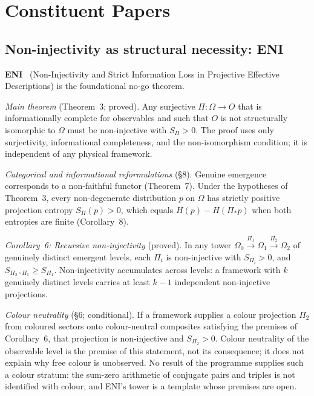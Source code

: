 \documentclass[11pt,a4paper]{article}
\theoremstyle{definition}
\newcommand{\SPI}{S_\Pi}
\begin{document}
  \section{Constituent Papers}
    \label{sec:papers}

    \subsection{Non-injectivity as structural necessity: ENI}
      \label{sec:eni}

      \textbf{ENI}~\cite{Beau2026l} (Non-Injectivity and Strict Information Loss in Projective
      Effective Descriptions) is the foundational no-go theorem.

      \textit{Main theorem} (Theorem~3; proved).
      Any surjective $\Pi : \Omega \to O$ that is informationally complete for observables
      and such that $O$ is not structurally isomorphic to $\Omega$ must be non-injective with
      $\SPI > 0$.
      The proof uses only surjectivity, informational completeness, and the non-isomorphism
      condition; it is independent of any physical framework.

      \textit{Categorical and informational reformulations} (§8).
      Genuine emergence corresponds to a non-faithful functor (Theorem~7).
      Under the hypotheses of Theorem~3, every non-degenerate distribution $p$ on $\Omega$ has
      strictly positive projection entropy $S_\Pi(p) > 0$, which equals $H(p) - H(\Pi_* p)$ when
      both entropies are finite (Corollary~8).

      \textit{Corollary~6: Recursive non-injectivity} (proved).
      In any tower $\Omega_0 \xrightarrow{\Pi_1} \Omega_1 \xrightarrow{\Pi_2} \Omega_2$ of
      genuinely distinct emergent levels, each $\Pi_i$ is non-injective with $S_{\Pi_i} > 0$,
      and $S_{\Pi_2 \circ \Pi_1} \geq S_{\Pi_1}$.
      Non-injectivity accumulates across levels: a framework with $k$ genuinely distinct
      levels carries at least $k-1$ independent non-injective projections.

      \textit{Colour neutrality} (§6; conditional).
      If a framework supplies a colour projection $\Pi_2$ from coloured sectors onto colour-neutral
      composites satisfying the premises of Corollary~6, that projection is non-injective and
      $S_{\Pi_2} > 0$.
      Colour neutrality of the observable level is the premise of this statement, not its consequence;
      it does not explain why free colour is unobserved.
      No result of the programme supplies such a colour stratum: the sum-zero arithmetic of conjugate
      pairs and triples is not identified with colour, and ENI's tower is a template whose premises are
      open.
\end{document}

